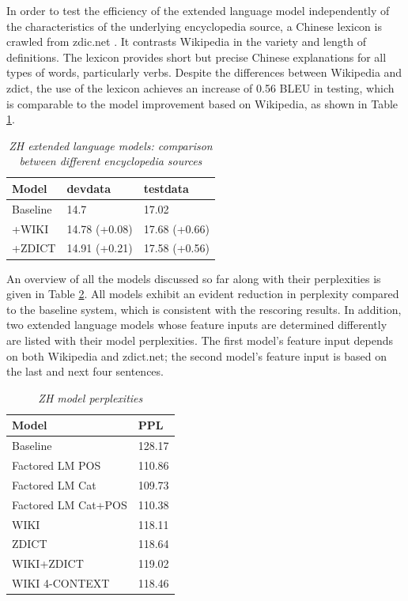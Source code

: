 \documentclass[a4paper]{article}
\begin{document}
In order to test the efficiency of the extended language model independently of the characteristics of the underlying encyclopedia  source, a Chinese lexicon is crawled from zdic.net \cite{zdic}. It contrasts Wikipedia in the variety and length of definitions. The lexicon provides short but precise Chinese explanations for all types of words, particularly verbs. Despite the differences between Wikipedia and zdict, the use of the lexicon achieves an increase of 0.56 BLEU in testing, which is comparable to the
model improvement based on Wikipedia, as shown in Table \ref{tb:zh-extended-diff-sources}.

\begin{table}
\caption{\it ZH extended language models: comparison between different encyclopedia sources}
\vspace{2mm}
\centering
  \begin{tabular}{lll}
  	\hline
  	Model    & devdata       & testdata      \\ \hline\hline
  	Baseline & 14.7          & 17.02         \\ \hline
  	+WIKI    & 14.78 (+0.08) & 17.68 (+0.66) \\
  	+ZDICT    & 14.91 (+0.21) & 17.58 (+0.56) \\ \hline
  \end{tabular}
  \label{tb:zh-extended-diff-sources}
\end{table}

An overview of all the models discussed so far along with their perplexities is given in Table \ref{tb:PPL}. All models exhibit an evident reduction in perplexity compared to the baseline system, which is consistent with the rescoring results. In addition, two extended language models whose feature inputs are determined differently are listed with their model perplexities. The first model's feature input depends on both Wikipedia and zdict.net; the second model's feature input is based on the last and next four sentences.

\begin{table}
  \caption{\it ZH model perplexities}
  \vspace{2mm}
  \centering
  \begin{tabular}{ ll}
  	\hline
  	Model               & PPL    \\ \hline\hline
  	Baseline            & 128.17 \\ \hline
  	Factored LM POS     & 110.86 \\
  	Factored LM Cat     & 109.73 \\
  	Factored LM Cat+POS & 110.38 \\ \hline
  	WIKI                & 118.11 \\
  	ZDICT               & 118.64 \\ 
  	WIKI+ZDICT			& 119.02 \\ 
	WIKI 4-CONTEXT		& 118.46 \\ \hline
  \end{tabular}
  \label{tb:PPL}
\end{table}
\end{document}
